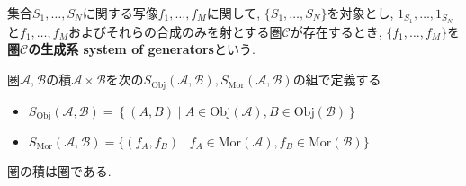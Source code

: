 \begin{comment}
\begin{proof}
\end{proof}
\end{comment}
\begin{Def}
集合$S_1,\dots,S_N$に関する写像$f_1,\dots,f_M$に関して,
$\{S_1,\dots,S_N\}$を対象とし,
$1_{S_1},\dots,1_{S_N}$と$f_1,\dots,f_M$およびそれらの合成のみを射とする圏$\mathscr{C}$が存在するとき, $\{f_1,\dots,f_M\}$を{\bf 圏$\mathscr{C}$の生成系 system of generators}という.
\end{Def}
\begin{Def}
圏$\mathscr{A},\mathscr{B}$の積$\mathscr{A}\times\mathscr{B}$を次の$S_{\mathrm{Obj}}\left(\mathscr{A},\mathscr{B}\right),S_{\mathrm{Mor}}\left(\mathscr{A},\mathscr{B}\right)$の組で定義する
\begin{itemize}
\item $S_{\mathrm{Obj}}\left(\mathscr{A},\mathscr{B}\right)
=\left\{(A,B)\mid A\in\mathrm{Obj}(\mathscr{A}),B\in\mathrm{Obj}(\mathscr{B})\right\}$
\item $S_{\mathrm{Mor}}\left(\mathscr{A},\mathscr{B}\right)
=\{(f_A,f_B)\mid f_A\in\mathrm{Mor(\mathscr{A})},
f_B\in\mathrm{Mor(\mathscr{B})}\}$
\end{itemize}
\end{Def}
\begin{Prop}
圏の積は圏である.
\end{Prop}

